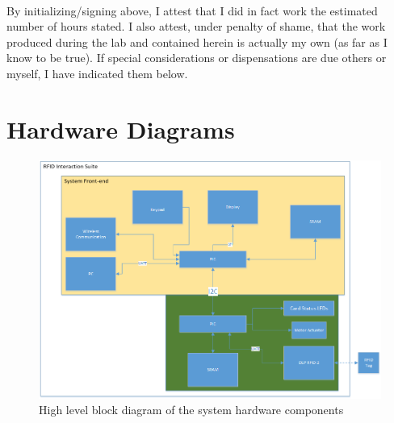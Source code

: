 \documentclass[12pt]{article} %
\begin{document}
~\\

By initializing/signing above, I attest that I did in fact work the
estimated number of hours stated. I also attest, under penalty of shame,
that the work produced during the lab and contained herein is actually my
own (as far as I know to be true). If special considerations or
dispensations are due others or myself, I have indicated them below.

\pagebreak

\section{Hardware Diagrams\label{appendix:hwDiagrams}}
\begin{figure}[H]
	\centering
	\includegraphics[width=\textwidth]{images/BlockDiagram.png}
	\caption{High level block diagram of the system hardware components}
	\label{fig:highLevelBlockDiagram}
\end{figure}
\end{document}
